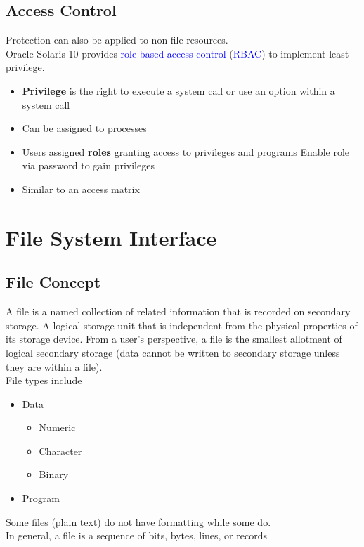 \documentclass{book/custombook}
\begin{document}
            \subsection{Access Control}
                Protection can also be applied to non file resources.\\
                Oracle Solaris 10 provides \textcolor{blue}{role-based access control} (\textcolor{blue}{RBAC})
                to implement least privilege.\\
                \begin{itemize}
                    \item \textbf{Privilege} is the right to execute a system call or use an option within a system call
                    \item Can be assigned to processes
                    \item Users assigned \textbf{roles} granting access to privileges and programs
                        \subitem Enable role via password to gain privileges
                    \item Similar to an access matrix
                \end{itemize}
        \section{File System Interface}
            \subsection{File Concept}
                A file is a named collection of related information that is recorded on secondary storage.
                A logical storage unit that is independent from the physical properties of its storage device.
                From a user's perspective, a file is the smallest allotment of logical secondary storage (data cannot
                be written to secondary storage unless they are within a file).\\
                File types include
                \begin{itemize}
                    \item Data
                        \begin{itemize}
                            \item Numeric
                            \item Character
                            \item Binary
                        \end{itemize}
                    \item Program
                \end{itemize}
                Some files (plain text) do not have formatting while some do.\\
                In general, a file is a sequence of bits, bytes, lines, or records
\end{document}
